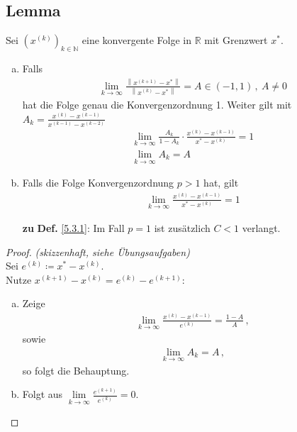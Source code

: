 \documentclass[ngerman,fontsize=11pt, paper=a4, parskip=half, titlepage=true, toc=bib]{scrbook}
\newcommand{\R}{\mathds{R}}
\newcommand{\N}{\mathds{N}}
\newcommand{\nn}[1]{\left\| #1 \right\|}
\begin{document}
  \subsection{Lemma} \label{5.3.5}
  Sei $(x^{(k)})_{k\in\N}$ eine konvergente Folge in $\R$ mit Grenzwert $x^{*}$.
  \begin{enumerate}[a)]
  \item Falls 
    \begin{gather}
      \lim\limits_{k\rightarrow \infty}\frac{\nn{x^{(k+1)}-x^{*}}}{\nn{x^{(k)}-x^{*}}}=
      A\in (-1,1)\, ,~ A\neq 0
      \label{V.3.1}
    \end{gather}
    hat die Folge genau die Konvergenzordnung 1.
    Weiter gilt mit $A_k=\frac{x^{(k)}-x^{(k-1)}}{x^{(k-1)}-x^{(k-2)}}$
    \begin{gather}
      \lim\limits_{k\rightarrow \infty}\frac{A_k}{1-A_k}\cdot 
      \frac{x^{(k)}-x^{(k-1)}}{x^{*}-x^{(k)}}=1 
      \label{V.3.2}
      \\ \nonumber
      \lim\limits_{k\rightarrow\infty}A_k=A
    \end{gather}
  \item Falls die Folge Konvergenzordnung $p>1$ hat, gilt
    \begin{gather}
      \lim\limits_{k\rightarrow\infty}\frac{x^{(k)}-x^{(k-1)}}{x^{*}-x^{(k)}}=1
      \label{V.3.3}
    \end{gather}
  \item[\textbf{zu}]\textbf{Def.} \ref{5.3.1}:  Im Fall $p=1$ ist zusätzlich $C<1 $ verlangt.
  \end{enumerate}
  
  \begin{proof}
    \textit{(skizzenhaft, siehe Übungsaufgaben)}\\
    Sei $e^{(k)}\coloneqq x^{*}-x^{(k)}$.\\
    Nutze $x^{(k+1)}-x^{(k)} = e^{(k)}-e^{(k+1)}$:
    \begin{enumerate}[a)]
    \item Zeige 
      \begin{gather*} 
        \lim\limits_{k\rightarrow\infty}\frac{x^{(k)}-x^{(k-1)}}{e^{(k)}} = \frac{1-A}{A}\, ,
      \end{gather*}
      sowie
      \begin{gather*}
        \lim\limits_{k\rightarrow \infty}A_k = A \, ,
      \end{gather*}
      so folgt die Behauptung.
    \item Folgt aus $\lim\limits_{k\rightarrow\infty} \frac{e^{(k+1)}}{e^{(k)}} =0$.
    \end{enumerate}
  \end{proof}
\end{document}

